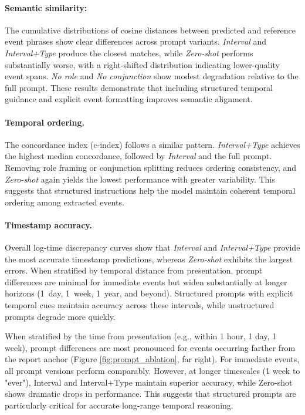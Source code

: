 \documentclass[pdflatex,sn-mathphys-num]{sn-jnl}%
\theoremstyle{thmstyleone}%
\theoremstyle{thmstyletwo}%
\theoremstyle{thmstylethree}%
\begin{document}
%

\paragraph{Semantic similarity:}
The cumulative distributions of cosine distances between predicted and reference event phrases show clear differences across prompt variants. \emph{Interval} and \emph{Interval+Type} produce the closest matches, while \emph{Zero-shot} performs substantially worse, with a right-shifted distribution indicating lower-quality event spans. \emph{No role} and \emph{No conjunction} show modest degradation relative to the full prompt. These results
demonstrate that including structured temporal guidance and explicit event formatting improves semantic alignment.

\paragraph{Temporal ordering.}
The concordance index (c-index) follows a similar pattern. \emph{Interval+Type} achieves the highest median concordance, followed by \emph{Interval} and the full prompt. Removing role
framing or conjunction splitting reduces ordering consistency, and \emph{Zero-shot} again yields the lowest performance with greater variability. This suggests that structured instructions help the model maintain coherent temporal ordering among extracted events.

\paragraph{Timestamp accuracy.}
Overall log-time discrepancy curves show that \emph{Interval} and \emph{Interval+Type} provide the most accurate timestamp predictions, whereas \emph{Zero-shot} exhibits the largest errors. When stratified by temporal distance from presentation, prompt differences are minimal for
immediate events but widen substantially at longer horizons (1~day, 1~week, 1~year, and beyond). Structured prompts with explicit temporal cues maintain accuracy across these
intervals, while unstructured prompts degrade more quickly.

When stratified by the time from presentation (e.g., within 1 hour, 1 day, 1 week), prompt differences are most pronounced for events occurring farther from the report anchor (Figure \ref{fig:prompt_ablation}, far right). For immediate events, all prompt versions perform comparably. However, at longer timescales (1 week to "ever"), Interval and Interval+Type maintain superior accuracy, while Zero-shot shows dramatic drops in performance. This suggests that structured prompts are particularly critical for accurate long-range temporal reasoning.
\end{document}
